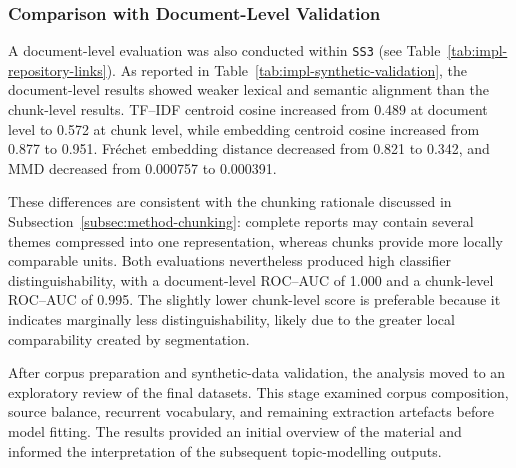 \subsubsection*{Comparison with Document-Level Validation}

A document-level evaluation was also conducted within \texttt{SS3} (see
Table~\ref{tab:impl-repository-links}). As reported in
Table~\ref{tab:impl-synthetic-validation}, the document-level results showed weaker
lexical and semantic alignment than the chunk-level results. TF--IDF centroid cosine
increased from 0.489 at document level to 0.572 at chunk level, while embedding
centroid cosine increased from 0.877 to 0.951. Fr\'echet embedding distance decreased
from 0.821 to 0.342, and MMD decreased from 0.000757 to 0.000391.

These differences are consistent with the chunking rationale discussed in
Subsection~\ref{subsec:method-chunking}: complete reports may contain several themes
compressed into one representation, whereas chunks provide more locally comparable
units. Both evaluations nevertheless produced high classifier distinguishability,
with a document-level ROC--AUC of 1.000 and a chunk-level ROC--AUC of 0.995. The
slightly lower chunk-level score is preferable because it indicates marginally less
distinguishability, likely due to the greater local comparability created by
segmentation.

After corpus preparation and synthetic-data validation, the analysis moved to an
exploratory review of the final datasets. This stage examined corpus composition,
source balance, recurrent vocabulary, and remaining extraction artefacts before model
fitting. The results provided an initial overview of the material and informed the
interpretation of the subsequent topic-modelling outputs.

